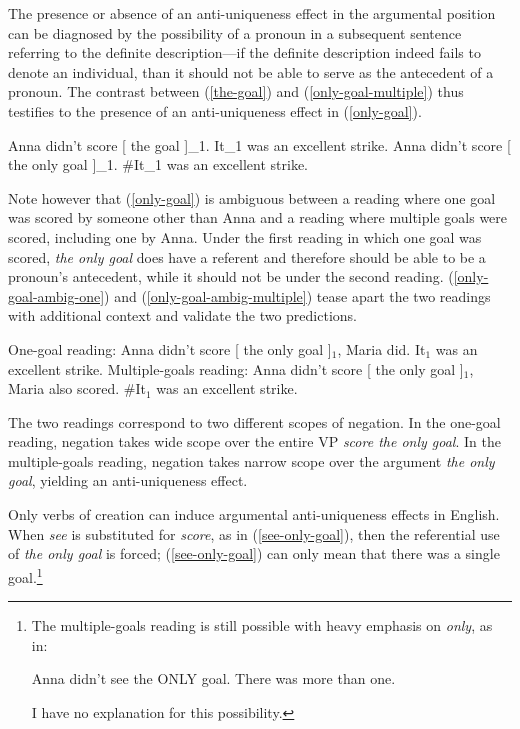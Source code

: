 \documentclass{article}
\begin{document}
The presence or absence of an anti-uniqueness effect in the argumental position can be diagnosed by the possibility of a pronoun in a subsequent sentence referring to the definite description---if the definite description indeed fails to denote an individual, than it should not be able to serve as the antecedent of a pronoun. The contrast between (\ref{the-goal}) and (\ref{only-goal-multiple}) thus testifies to the presence of an anti-uniqueness effect in (\ref{only-goal}).

\begin{exe}
	\ex \label{the-goal} Anna didn't score [ the goal ]_1. It_1 was an excellent strike.
	\ex \label{only-goal-multiple} Anna didn't score [ the only goal ]_1. \#It_1 was an excellent strike.
\end{exe}

Note however that (\ref{only-goal}) is ambiguous between a reading where one goal was scored by someone other than Anna and a reading where multiple goals were scored, including one by Anna. Under the first reading in which one goal was scored, \textit{the only goal} does have a referent and therefore should be able to be a pronoun's antecedent, while it should not be under the second reading. (\ref{only-goal-ambig-one}) and (\ref{only-goal-ambig-multiple}) tease apart the two readings with additional context and validate the two predictions.

\begin{exe}
	\ex \label{only-goal-ambig-one} One-goal reading: Anna didn't score [ the only goal ]$_1$, Maria did. It$_1$ was an excellent strike.
	\ex \label{only-goal-ambig-multiple} Multiple-goals reading: Anna didn't score [ the only goal ]$_1$, Maria also scored. \#It$_1$ was an excellent strike.
\end{exe}

The two readings correspond to two different scopes of negation. In the one-goal reading, negation takes wide scope over the entire VP \textit{score the only goal}. In the multiple-goals reading, negation takes narrow scope over the argument \textit{the only goal}, yielding an anti-uniqueness effect.

Only verbs of creation can induce argumental anti-uniqueness effects in English. When \textit{see} is substituted for \textit{score}, as in (\ref{see-only-goal}), then the referential use of \textit{the only goal} is forced; (\ref{see-only-goal}) can only mean that there was a single goal.\footnote{The multiple-goals reading is still possible with heavy emphasis on \textit{only}, as in: \begin{exe} \ex Anna didn't see the ONLY goal. There was more than one. \end{exe} I have no explanation for this possibility.}
\end{document}
